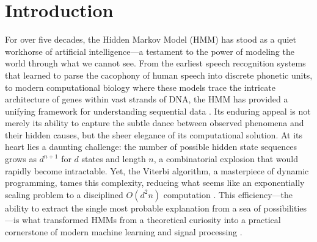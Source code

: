 \documentclass[12pt, reco]{article}
\begin{document}
\section{Introduction}
For over five decades, the Hidden Markov Model (HMM) has stood as a quiet workhorse of artificial intelligence—a testament to the power of modeling the world through what we cannot see. From the earliest speech recognition systems that learned to parse the cacophony of human speech into discrete phonetic units, to modern computational biology where these models trace the intricate architecture of genes within vast strands of DNA, the HMM has provided a unifying framework for understanding sequential data \cite{Rab2002, Eddy1996, Mor2021}. Its enduring appeal is not merely its ability to capture the subtle dance between observed phenomena and their hidden causes, but the sheer elegance of its computational solution. At its heart lies a daunting challenge: the number of possible hidden state sequences grows as \(d^{n+1}\) for \(d\) states and length \(n\), a combinatorial explosion that would rapidly become intractable. Yet, the Viterbi algorithm, a masterpiece of dynamic programming, tames this complexity, reducing what seems like an exponentially scaling problem to a disciplined \(O(d^2 n)\) computation \cite{V03, FV05, lou95}. This efficiency—the ability to extract the single most probable explanation from a sea of possibilities—is what transformed HMMs from a theoretical curiosity into a practical cornerstone of modern machine learning and signal processing \cite{Alali2024, WhiteMahonyBrushe00, Mitchell1997}. 
\end{document}
